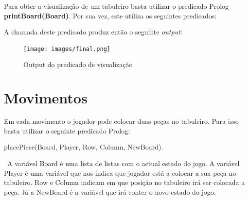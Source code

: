 \documentclass[a4paper]{article}
\begin{document}
Para obter a visualização de um tabuleiro basta utilizar o predicado Prolog  \textbf{printBoard(Board)}. Por sua vez, este utiliza os seguintes predicados: 
\linebreak\

A chamada deste predicado produz então o seguinte  \textit{output}:
\begin{figure}[H]
    \centering
    \texttt{[image: images/final.png]}
    \caption{Output do predicado de visualização}
    \label{fig:final_board}
\end{figure}

\newpage
\section{Movimentos}


Em cada movimento o jogador pode colocar duas peças no tabuleiro. Para isso basta utilizar o seguinte predicado Prolog:
\linebreak
\linebreak
\centerline{placePiece(Board, Player, Row, Column, NewBoard).}
\linebreak
\linebreak\
A variável Board é uma lista de listas com o actual estado do jogo. A variável Player é uma variável que nos indica que jogador está a colocar a sua peça no tabuleiro. Row e Column indicam em que posição no tabuleiro irá ser colocada a peça. Já a NewBoard é a variável que irá conter o novo estado do jogo.
\end{document}
